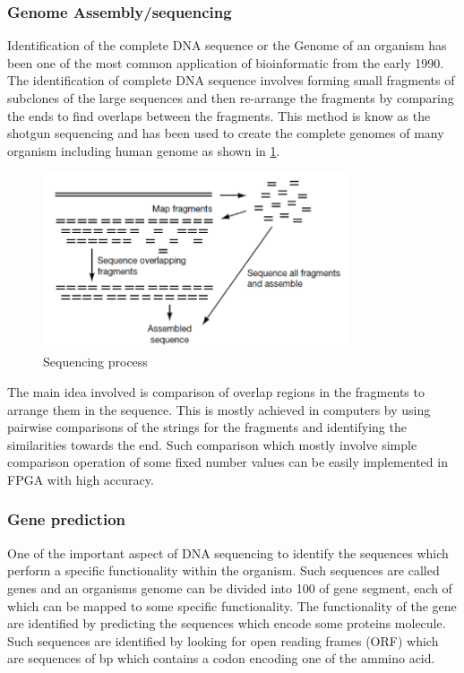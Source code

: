 \documentclass[12pt,twoside]{article}
\begin{document}
\subsubsection{Genome Assembly/sequencing}

Identification of the complete DNA sequence or the Genome of an organism has been one of the most common
application of bioinformatic from the early 1990. The identification of complete DNA sequence involves
forming small fragments of subclones of the large sequences and then re-arrange the fragments by comparing
the ends to find overlaps between the fragments\cite[Chapter 2, Genome sequencing]{mount_bioinformatics:_2004}.
This method is know as the shotgun sequencing and has been used to create the complete genomes of many organism
including human genome as shown in \cref{fig:sequence}.

\begin{figure}%
    \centering
    \includegraphics[width=0.8\textwidth]{fig/sequence}
    \caption{Sequencing process \cite[Figure 2.4]{mount_bioinformatics:_2004}}
    \label{fig:sequence}
\end{figure}

The main idea involved is comparison of overlap regions in the fragments to arrange them in the sequence. This
is mostly achieved in computers by using pairwise comparisons of the strings for the fragments and identifying
the similarities towards the end. Such comparison which mostly involve simple comparison operation of some
fixed number values can be easily implemented in FPGA with high accuracy.

\subsubsection{Gene prediction}

One of the important aspect of DNA sequencing to identify the sequences which perform a specific functionality
within the organism. Such sequences are called genes and an organisms genome can be divided into 100 of gene
segment, each of which can be mapped to some specific functionality. The functionality of the gene are identified
by predicting the sequences which encode some proteins molecule. Such sequences are identified by looking for
open reading frames (ORF) which are sequences of bp which contains a codon encoding one of the ammino acid.
\end{document}
